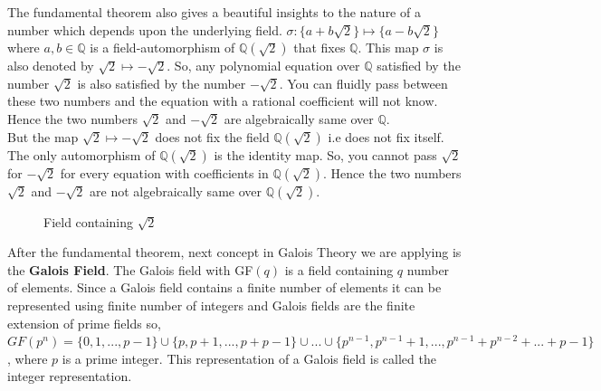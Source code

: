 \documentclass[a4paper,twoside,10pt]{article}
\theoremstyle{plain}
\theoremstyle{definition}
\begin{document}
\noindent
The fundamental theorem also gives a beautiful insights to the nature of a number which depends upon the underlying field. \(\sigma:\{a+b\sqrt{2}\} \mapsto \{a-b\sqrt{2}\}\) where \(a,b \in \mathbb{Q}\) is a field-automorphism of  \(\mathbb{Q}(\sqrt{2})\) that fixes \(\mathbb{Q}\). This map \(\sigma \) is also denoted by \(\sqrt{2} \longmapsto -\sqrt{2}\). So, any polynomial equation over \(\mathbb{Q}\) satisfied by the number \(\sqrt{2}\) is also satisfied by the number \(-\sqrt{2}\). You can fluidly pass between these two numbers and the equation with a rational coefficient will not know. Hence the two numbers \(\sqrt{2}\) and \(-\sqrt{2}\) are algebraically same over \(\mathbb{Q}\).\\

But the map \(\sqrt{2} \longmapsto -\sqrt{2}\) does not fix the field \(\mathbb{Q}(\sqrt{2})\) i.e does not fix itself. The only automorphism of \(\mathbb{Q}(\sqrt{2})\) is the identity map. So, you cannot pass \(\sqrt{2}\) for \(-\sqrt{2}\) for every equation with coefficients in \(\mathbb{Q}(\sqrt{2})\). Hence the two numbers \(\sqrt{2}\) and \(-\sqrt{2}\) are not algebraically same over \(\mathbb{Q}(\sqrt{2})\).

\begin{figure}[h]
  \centering
  \small
    \caption{\footnotesize Field containing \(\sqrt{2}\)}
    \end{figure}

After the fundamental theorem, next concept in Galois Theory we are applying is the \textbf{Galois Field}. The Galois field with GF\((q)\) is a field containing \(q\) number of elements. Since a Galois field contains a finite number of elements it can be represented using finite number of integers \cite{galois} and Galois fields are the finite extension of prime fields so,\\
\(GF(p^n)=\{0,1,...,p-1\} \cup \{p,p+1,...,p+p-1\} \cup ... \cup \{p^{n-1},p^{n-1}+1,...,p^{n-1}+p^{n-2}+...+p-1\}\), where \(p\) is a prime integer. This representation of a Galois field is called the integer representation.
\end{document}

